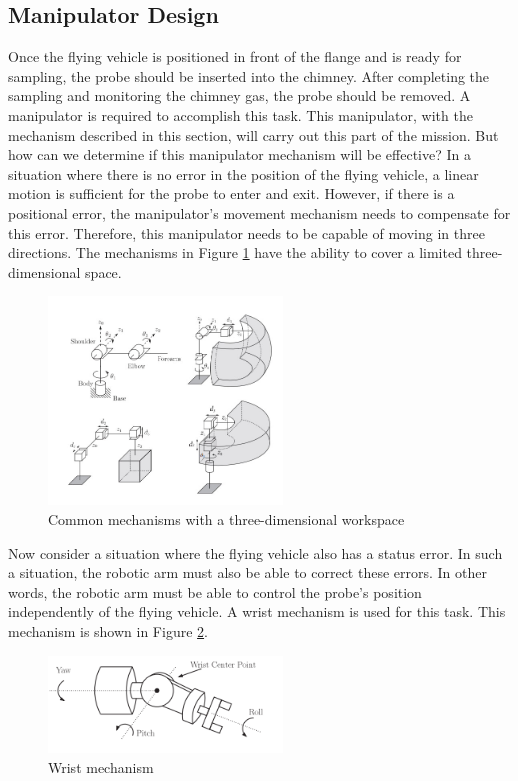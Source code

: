 \documentclass[lettersize,journal]{IEEEtran}
\begin{document}
\subsection{Manipulator Design}
Once the flying vehicle is positioned in front of the flange and is ready for sampling, the probe should be inserted into the chimney. After completing the sampling and monitoring the chimney gas, the probe should be removed. A manipulator is required to accomplish this task. This manipulator, with the mechanism described in this section, will carry out this part of the mission. But how can we determine if this manipulator mechanism will be effective? In a situation where there is no error in the position of the flying vehicle, a linear motion is sufficient for the probe to enter and exit. However, if there is a positional error, the manipulator's movement mechanism needs to compensate for this error. Therefore, this manipulator needs to be capable of moving in three directions. The mechanisms in Figure \ref{fig.3d_mechanisms} have the ability to cover a limited three-dimensional space.

\begin{figure}[!t]
\centering
\includegraphics[width=2.45in]{./Pictures/3D_Mechanisms}
\caption{Common mechanisms with a three-dimensional workspace ~\cite{spong2020robot}}
\label{fig.3d_mechanisms}
\end{figure}

Now consider a situation where the flying vehicle also has a status error. In such a situation, the robotic arm must also be able to correct these errors. In other words, the robotic arm must be able to control the probe's position independently of the flying vehicle. A wrist mechanism is used for this task. This mechanism is shown in Figure \ref{fig.wrist_mechanism}.

\begin{figure}[!t]
\centering
\includegraphics[width=2.45in]{./Pictures/Wrist_Mechanim}
\caption{Wrist mechanism ~\cite{spong2020robot}}
\label{fig.wrist_mechanism}
\end{figure}
\end{document}
